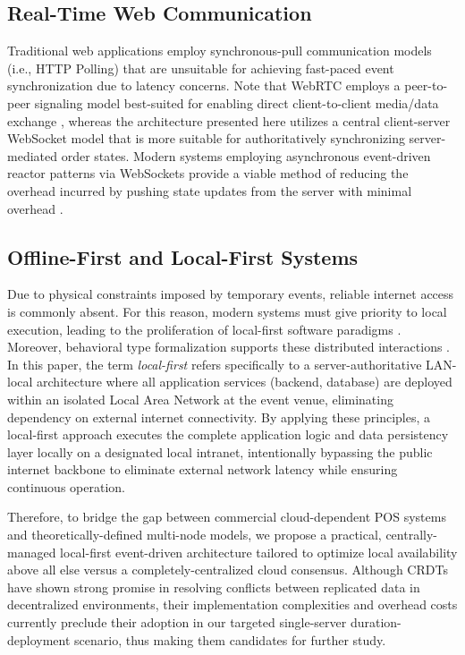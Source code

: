 \documentclass[conference]{IEEEtran}
\begin{document}
\subsection{Real-Time Web Communication}

Traditional web applications employ synchronous-pull communication models (i.e., HTTP Polling) that are unsuitable for achieving fast-paced event synchronization due to latency concerns. Note that WebRTC employs a peer-to-peer signaling model best-suited for enabling direct client-to-client media/data exchange \cite{sharma2024peer}, whereas the architecture presented here utilizes a central client-server WebSocket model that is more suitable for authoritatively synchronizing server-mediated order states. Modern systems employing asynchronous event-driven reactor patterns via WebSockets \cite{trnka2021communication} provide a viable method of reducing the overhead incurred by pushing state updates from the server with minimal overhead \cite{kooli2021energy}.

\subsection{Offline-First and Local-First Systems}

Due to physical constraints imposed by temporary events, reliable internet access is commonly absent. For this reason, modern systems must give priority to local execution, leading to the proliferation of local-first software paradigms \cite{kleppmann2019local}. Moreover, behavioral type formalization supports these distributed interactions \cite{kuhn2024behavioural}. In this paper, the term \textit{local-first} refers specifically to a server-authoritative LAN-local architecture where all application services (backend, database) are deployed within an isolated Local Area Network at the event venue, eliminating dependency on external internet connectivity. By applying these principles, a local-first approach executes the complete application logic and data persistency layer locally on a designated local intranet, intentionally bypassing the public internet backbone to eliminate external network latency while ensuring continuous operation.

Therefore, to bridge the gap between commercial cloud-dependent POS systems and theoretically-defined multi-node models, we propose a practical, centrally-managed local-first event-driven architecture tailored to optimize local availability above all else versus a completely-centralized cloud consensus. Although CRDTs \cite{shapiro2011crdt} have shown strong promise in resolving conflicts between replicated data in decentralized environments, their implementation complexities and overhead costs currently preclude their adoption in our targeted single-server duration-deployment scenario, thus making them candidates for further study.
\end{document}
